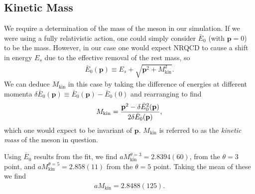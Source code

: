 
\subsection{Kinetic Mass}
\label{sec:kinetic_mass}

We require a determination of the mass of the meson in our simulation. If we were using a fully relativistic action, one could simply consider $\bar{E}_0$ (with ${\textbf{p}}=0$) to be the mass. However, in our case one would expect NRQCD to cause a shift in energy $E_s$ due to the effective removal of the rest mass, so
\begin{align}
 \bar{E}_0({\textbf{p}}) \equiv E_s + \sqrt{ {\textbf{p}}^2 + M_{\text{kin}}^2 }.
 \label{eq:euclidean_energy}
\end{align}
We can deduce $M_{\text{kin}}$ in this case by taking the difference of energies at different momenta $\delta \bar{E}_0({\textbf{p}}) \equiv \bar{E}_0({\textbf{p}}) - \bar{E}_0(0)$ and rearranging to find
\begin{align}
 M_{\text{kin}} = { {\textbf{p}}^2 - \delta \bar{E}_0^2({\textbf{p}}) \over 2\delta \bar{E}_0({\textbf{p}}) },
 \label{eq:kinetic_mass}
\end{align}
which one would expect to be invariant of ${\textbf{p}}$. $M_{\text{kin}}$ is referred to as the \textit{kinetic mass} of the meson in question.

Using $\bar{E}_0$ results from the fit, we find $aM_{\text{kin}}^{\theta=3} = 2.8394(60)$, from the $\theta=3$ point, and $aM_{\text{kin}}^{\theta=5} = 2.858(11)$ from the $\theta=5$ point. Taking the mean of these we find
\begin{align}
  aM_{\text{kin}} = 2.8488(125).
  \label{eq:kineticmass_Bc}
\end{align}

